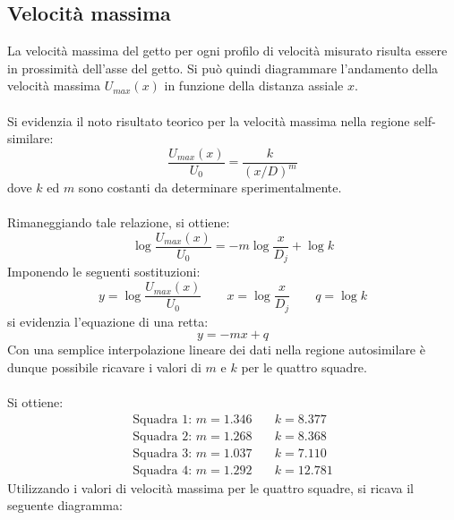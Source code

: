 \subsection{Velocità massima}
La velocità massima del getto per ogni profilo di velocità misurato risulta essere in prossimità dell'asse del getto. Si può quindi diagrammare l'andamento della velocità massima $U_{max}(x)$ in funzione della distanza assiale $x$.\\\\
Si evidenzia il noto risultato teorico per la velocità massima nella regione self-similare:
\begin{equation*}
    \frac{U_{max}(x)}{U_0} = \frac{k}{(x/D)^m}
\end{equation*}
dove $k$ ed $m$ sono costanti da determinare sperimentalmente.\\\\
Rimaneggiando tale relazione, si ottiene:
\begin{equation*}
    \log \frac{U_{max}(x)}{U_0} = -m \log\frac{x}{D_j} + \log k
\end{equation*}
Imponendo le seguenti sostituzioni:
\begin{equation*}
    y = \log \frac{U_{max}(x)}{U_0} \qquad x = \log\frac{x}{D_j} \qquad q = \log k
\end{equation*}
si evidenzia l'equazione di una retta:
\begin{equation*}
    y = -mx + q
\end{equation*}
Con una semplice interpolazione lineare dei dati nella regione autosimilare è dunque possibile ricavare i valori di $m$ e $k$ per le quattro squadre.\\\\
Si ottiene:
\begin{equation*}
    \begin{split}
        \text{Squadra 1: } m = 1.346 &\quad k = 8.377\\
        \text{Squadra 2: } m = 1.268 &\quad k = 8.368\\
        \text{Squadra 3: } m = 1.037 &\quad k = 7.110\\
        \text{Squadra 4: } m = 1.292 &\quad k = 12.781
    \end{split}
\end{equation*}
Utilizzando i valori di velocità massima per le quattro squadre, si ricava il seguente diagramma:
